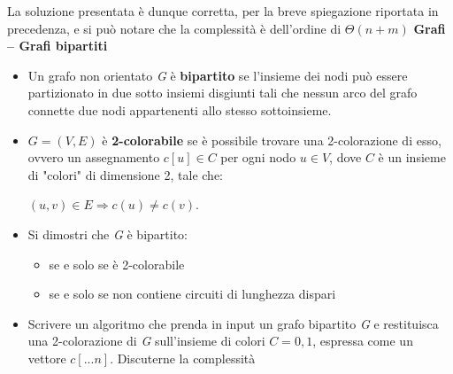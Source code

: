 \documentclass[../cheatSheetAlgoritmi.tex]{subfiles}
\begin{document}
La soluzione presentata è dunque corretta, per la breve spiegazione riportata in precedenza, e si può notare che la complessità è dell'ordine di $\Theta(n + m)$ 
\newpage
\textbf{Grafi – Grafi bipartiti} \\
\begin{itemize}
	\item Un grafo non orientato \textit{G} è \textbf{bipartito} se l’insieme dei nodi può essere partizionato in due sotto insiemi disgiunti tali che nessun arco del grafo connette due nodi appartenenti allo stesso sottoinsieme.
	\item $G = (V, E)$ è \textbf{2-colorabile} se è possibile trovare una 2-colorazione di esso, ovvero un assegnamento $c[u] \in C$ per ogni nodo $u \in V$, dove $C$ è un insieme di "colori" di dimensione 2, tale che: \\

	\begin{center}
		$(u, v) \in E \Rightarrow c(u) \neq c(v)$.
	\end{center}

	\item Si dimostri che \textit{G} è bipartito:
	
	\begin{itemize}
		\item se e solo se è 2-colorabile
		\item se e solo se non contiene circuiti di lunghezza dispari
	\end{itemize}
	\item Scrivere un algoritmo che prenda in input un grafo bipartito \textit{G} e restituisca una 2-colorazione di \textit{G} sull’insieme di colori $C = {0,1}$, espressa come un vettore $c[...n]$. Discuterne la complessità
\end{itemize}
\end{document}
